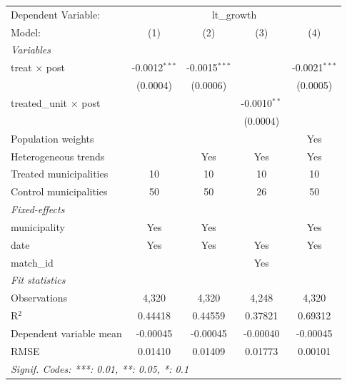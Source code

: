 
\begingroup
\centering
\begin{tabular}{lcccc}
   \tabularnewline \midrule \midrule
   Dependent Variable: & \multicolumn{4}{c}{lt\_growth}\\
   Model:                        & (1)             & (2)             & (3)            & (4)\\  
   \midrule
   \emph{Variables}\\
   treat $\times$ post           & -0.0012$^{***}$ & -0.0015$^{***}$ &                & -0.0021$^{***}$\\   
                                 & (0.0004)        & (0.0006)        &                & (0.0005)\\   
   treated\_unit $\times$ post   &                 &                 & -0.0010$^{**}$ &   \\   
                                 &                 &                 & (0.0004)       &   \\   
   Population weights            &                 &                 &                & Yes\\  
   Heterogeneous trends          &                 & Yes             & Yes            & Yes\\  
   Treated municipalities        & 10              & 10              & 10             & 10\\  
   Control municipalities        & 50              & 50              & 26             & 50\\  
   \midrule
   \emph{Fixed-effects}\\
   municipality                  & Yes             & Yes             &                & Yes\\  
   date                          & Yes             & Yes             & Yes            & Yes\\  
   match\_id                     &                 &                 & Yes            & \\  
   \midrule
   \emph{Fit statistics}\\
   Observations                  & 4,320           & 4,320           & 4,248          & 4,320\\  
   R$^2$                         & 0.44418         & 0.44559         & 0.37821        & 0.69312\\  
   Dependent variable mean       & -0.00045        & -0.00045        & -0.00040       & -0.00045\\  
   RMSE                          & 0.01410         & 0.01409         & 0.01773        & 0.00101\\  
   \midrule \midrule
   \multicolumn{5}{l}{\emph{Signif. Codes: ***: 0.01, **: 0.05, *: 0.1}}\\
\end{tabular}
\par\endgroup


